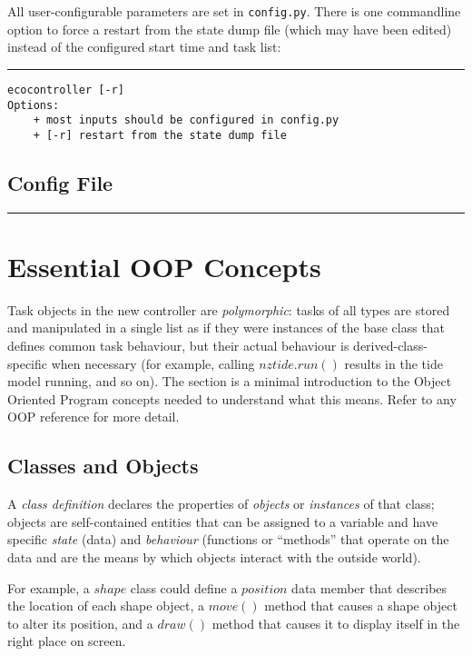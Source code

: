 \documentclass[11pt,a4paper]{report}
\begin{document}
All user-configurable parameters are set in \verb#config.py#. There is
one commandline option to force a restart from the state dump file
(which may have been edited) instead of the configured start time and
task list:

\lstset{language=sh}

\noindent
\rule{5cm}{.2mm}
\begin{lstlisting}
ecocontroller [-r]
Options:
    + most inputs should be configured in config.py
    + [-r] restart from the state dump file
\end{lstlisting}

\lstset{language=Python}

\section{Config File}

\noindent
\rule{5cm}{.2mm}


\appendix

\chapter{Essential OOP Concepts}

Task objects in the new controller are {\em polymorphic}: tasks of all
types are stored and manipulated in a single list as if they were
instances of the base class that defines common task behaviour, but
their actual behaviour is derived-class-specific when necessary (for
example, calling $nztide.run()$ results in the tide model running, and
so on). The section is a minimal introduction to the Object Oriented
Program concepts needed to understand what this means.  Refer to any OOP
reference for more detail.

\section{Classes and Objects}

A {\em class definition} declares the properties of {\em objects} or
{\em instances} of that class; objects are self-contained entities that
can be assigned to a variable and have specific {\em state} (data) and
{\em behaviour} (functions or ``methods'' that operate on the data and
are the means by which objects interact with the outside world).    

For example, a $shape$ class could define a $position$ data member that
describes the location of each shape object, a $move()$ method that
causes a shape object to alter its position, and a $draw()$ method that
causes it to display itself in the right place on screen.
\end{document}
